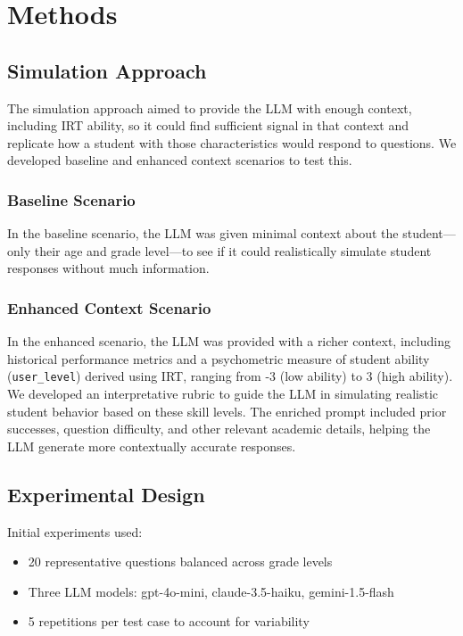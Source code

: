 \documentclass[
    a4paper, %
    10pt, %
    twoside %
]{LTJournalArticle}
\begin{document}
\section{Methods}

\subsection{Simulation Approach}
The simulation approach aimed to provide the LLM with enough context, including IRT ability, so it could find sufficient signal in that context and replicate how a student with those characteristics would respond to questions. We developed baseline and enhanced context scenarios to test this.

\subsubsection{Baseline Scenario}
In the baseline scenario, the LLM was given minimal context about the student—only their age and grade level—to see if it could realistically simulate student responses without much information.

\subsubsection{Enhanced Context Scenario}
In the enhanced scenario, the LLM was provided with a richer context, including historical performance metrics and a psychometric measure of student ability (\texttt{user\_level}) derived using IRT, ranging from -3 (low ability) to 3 (high ability). We developed an interpretative rubric to guide the LLM in simulating realistic student behavior based on these skill levels. The enriched prompt included prior successes, question difficulty, and other relevant academic details, helping the LLM generate more contextually accurate responses.

\subsection{Experimental Design}
Initial experiments used:
\begin{itemize}
    \item 20 representative questions balanced across grade levels
    \item Three LLM models: gpt-4o-mini, claude-3.5-haiku, gemini-1.5-flash
    \item 5 repetitions per test case to account for variability
\end{itemize}
\end{document}

